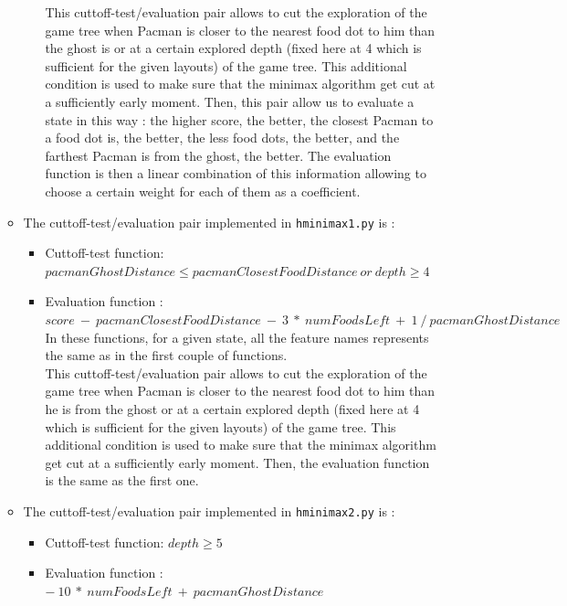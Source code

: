 \documentclass{article}
\begin{document}
\begin{enumerate}[label=\alph*.,leftmargin=*]
\begin{itemize}
\begin{itemize}
					This cuttoff-test/evaluation pair allows to cut the exploration of the game tree when Pacman is closer to the nearest food dot to him than the ghost is or at a certain explored depth (fixed here at 4 which is sufficient for the given layouts) of the game tree. This additional condition is used to make sure that the minimax algorithm get cut at a sufficiently early moment. Then, this pair allow us to evaluate a state in this way : the higher score, the better, the closest Pacman to a food dot is, the better, the less food dots, the better, and the farthest Pacman is from the ghost, the better. The evaluation function is then a linear combination of this information allowing to choose a certain weight for each of them as a coefficient.\\
				\end{itemize} 

			\item The cuttoff-test/evaluation pair implemented in \texttt{hminimax1.py} is :
				\begin{itemize}
					\item Cuttoff-test function: $pacmanGhostDistance \leq pacmanClosestFoodDistance \ or \ depth \geq 4$
					\item Evaluation function : $score \ - \ pacmanClosestFoodDistance \ - \ 3 \ * \ numFoodsLeft \ + \ 1 \ / \ pacmanGhostDistance$\\
				
					In these functions, for a given state, all the feature names represents the same as in the first couple of functions.\\
				
					This cuttoff-test/evaluation pair allows to cut the exploration of the game tree when Pacman is closer to the nearest food dot to him than he is from the ghost or at a certain explored depth (fixed here at 4 which is sufficient for the given layouts) of the game tree. This additional condition is used to make sure that the minimax algorithm get cut at a sufficiently early moment. Then, the evaluation function is the same as the first one.\\
				\end{itemize}

			\item The cuttoff-test/evaluation pair implemented in \texttt{hminimax2.py} is :
				\begin{itemize}
					\item Cuttoff-test function: $depth \geq 5$
					\item Evaluation function : $- \ 10 \ * \ numFoodsLeft \ + \ pacmanGhostDistance$\\
				

\end{itemize}
\end{itemize}
\end{enumerate}
\end{document}
